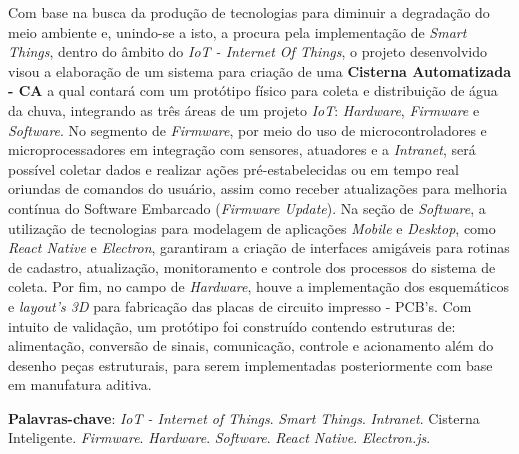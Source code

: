 
\begin{resumo}[RESUMO]
\begin{SingleSpacing}

 Com base na busca da produção de tecnologias para diminuir a degradação do meio ambiente e, unindo-se a isto, a procura pela implementação de \textit{Smart Things}, dentro do âmbito do \textit{IoT - Internet Of Things},  o projeto desenvolvido visou a elaboração de um sistema para criação de uma \textbf{Cisterna Automatizada - CA} a qual contará com um protótipo físico para coleta e distribuição de água da chuva, integrando as três áreas de um projeto \textit{IoT}: \textit{Hardware}, \textit{Firmware} e \textit{Software}. No segmento de \textit{Firmware}, por meio do uso de microcontroladores e microprocessadores em integração com sensores, atuadores e a \textit{Intranet}, será possível coletar dados e realizar ações pré-estabelecidas ou em tempo real oriundas de comandos do usuário, assim como receber atualizações para melhoria contínua do Software Embarcado (\textit{Firmware Update}).  Na seção de \textit{Software}, a utilização de tecnologias para modelagem de aplicações \textit{Mobile} e \textit{Desktop}, como  \textit{React Native} e \textit{Electron},  garantiram a criação de interfaces amigáveis para rotinas de cadastro, atualização, monitoramento e controle dos processos do sistema de coleta. Por fim, no campo de \textit{Hardware}, houve a implementação dos esquemáticos e \textit{layout's 3D}  para fabricação das placas de circuito impresso - PCB's. Com intuito de validação, um protótipo foi construído contendo estruturas de: alimentação, conversão de sinais, comunicação, controle e acionamento além do desenho peças estruturais, para serem implementadas posteriormente com base em manufatura aditiva.
 
\vspace{\onelineskip}

\textbf{Palavras-chave}: \textit{IoT - Internet of Things}. \textit{Smart Things}. \textit{Intranet}.  Cisterna Inteligente. \textit{Firmware}. \textit{Hardware}. \textit{Software}. \textit{React Native}. \textit{Electron.js}.

\end{SingleSpacing}
\end{resumo}


